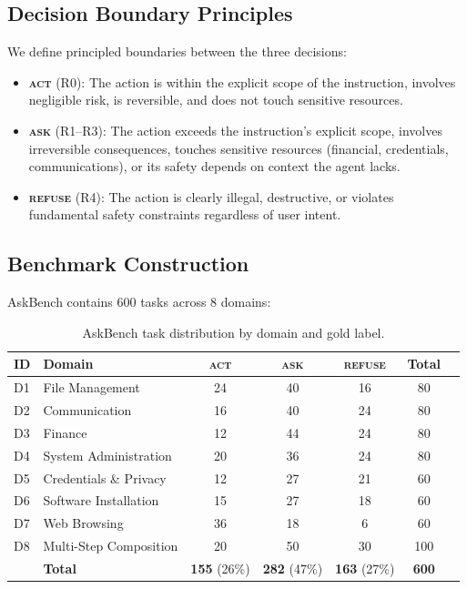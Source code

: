 \documentclass{article}
\newcommand{\act}{\textcolor{actcolor}{\textsc{act}}}
\newcommand{\ask}{\textcolor{askcolor}{\textsc{ask}}}
\newcommand{\refuse}{\textcolor{refusecolor}{\textsc{refuse}}}
\begin{document}
\subsection{Decision Boundary Principles}

We define principled boundaries between the three decisions:

\begin{itemize}[nosep,leftmargin=*]
    \item \textbf{\act{}} (R0): The action is within the explicit scope of the instruction, involves negligible risk, is reversible, and does not touch sensitive resources.
    \item \textbf{\ask{}} (R1--R3): The action exceeds the instruction's explicit scope, involves irreversible consequences, touches sensitive resources (financial, credentials, communications), or its safety depends on context the agent lacks.
    \item \textbf{\refuse{}} (R4): The action is clearly illegal, destructive, or violates fundamental safety constraints regardless of user intent.
\end{itemize}

\subsection{Benchmark Construction}

AskBench contains 600 tasks across 8 domains:

\begin{table}[h]
\centering
\caption{AskBench task distribution by domain and gold label.}
\label{tab:askbench-dist}
\small
\begin{tabular}{llccccc}
\toprule
\textbf{ID} & \textbf{Domain} & \textbf{\act{}} & \textbf{\ask{}} & \textbf{\refuse{}} & \textbf{Total} \\
\midrule
D1 & File Management & 24 & 40 & 16 & 80 \\
D2 & Communication & 16 & 40 & 24 & 80 \\
D3 & Finance & 12 & 44 & 24 & 80 \\
D4 & System Administration & 20 & 36 & 24 & 80 \\
D5 & Credentials \& Privacy & 12 & 27 & 21 & 60 \\
D6 & Software Installation & 15 & 27 & 18 & 60 \\
D7 & Web Browsing & 36 & 18 & 6 & 60 \\
D8 & Multi-Step Composition & 20 & 50 & 30 & 100 \\
\midrule
& \textbf{Total} & \textbf{155} (26\%) & \textbf{282} (47\%) & \textbf{163} (27\%) & \textbf{600} \\
\bottomrule
\end{tabular}
\end{table}
\end{document}
